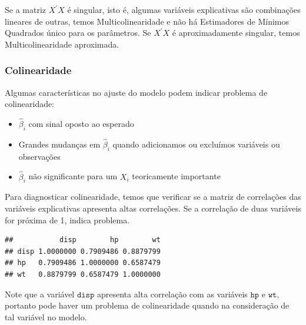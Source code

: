 \documentclass[
]{book}
\newenvironment{Shaded}{\begin{snugshade}}{\end{snugshade}}
\newcommand{\AttributeTok}[1]{\textcolor[rgb]{0.77,0.63,0.00}{#1}}
\newcommand{\FunctionTok}[1]{\textcolor[rgb]{0.00,0.00,0.00}{#1}}
\newcommand{\NormalTok}[1]{#1}
\newcommand{\OtherTok}[1]{\textcolor[rgb]{0.56,0.35,0.01}{#1}}
\newcommand{\SpecialCharTok}[1]{\textcolor[rgb]{0.00,0.00,0.00}{#1}}
\providecommand{\tightlist}{%
  \setlength{\itemsep}{0pt}\setlength{\parskip}{0pt}}
\begin{document}
Se a matriz \(X^\prime X\) é singular, isto é, algumas variáveis explicativas são combinações lineares de outras, temos Multicolinearidade e não há Estimadores de Mínimos Quadrados único para os parâmetros. Se \(X^\prime X\) é aproximadamente singular, temos Multicolinearidade aproximada.

\hypertarget{colinearidade}{%
\subsubsection{\texorpdfstring{\textbf{Colinearidade}}{Colinearidade}}\label{colinearidade}}

Algumas características no ajuste do modelo podem indicar problema de colinearidade:

\begin{itemize}
\tightlist
\item
  \(\hat{\beta}_i\) com sinal oposto ao esperado
\item
  Grandes mudanças em \(\hat{\beta}_i\) quando adicionamos ou excluímos variáveis ou observações
\item
  \(\hat{\beta}_i\) não significante para um \(X_i\) teoricamente importante
\end{itemize}

Para diagnosticar colinearidade, temos que verificar se a matriz de correlações das variáveis explicativas apresenta altas correlações. Se a correlação de duas variáveis for próxima de 1, indica problema.

\begin{Shaded}
\end{Shaded}

\begin{verbatim}
##           disp        hp        wt
## disp 1.0000000 0.7909486 0.8879799
## hp   0.7909486 1.0000000 0.6587479
## wt   0.8879799 0.6587479 1.0000000
\end{verbatim}

Note que a variável \(\texttt{disp}\) apresenta alta correlação com as variáveis \(\texttt{hp}\) e \(\texttt{wt}\), portanto pode haver um problema de colinearidade quando na consideração de tal variável no modelo.
\end{document}
